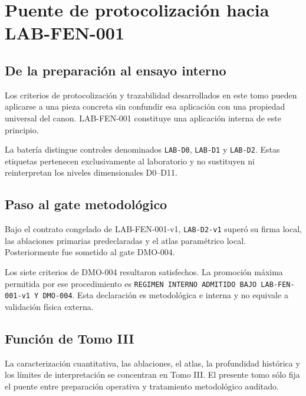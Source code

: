 \chapter*{Puente de protocolización hacia LAB-FEN-001}

\section*{De la preparación al ensayo interno}

\begin{observation}
Los criterios de protocolización y trazabilidad desarrollados en este tomo pueden aplicarse a una pieza concreta sin confundir esa aplicación con una propiedad universal del canon. LAB-FEN-001 constituye una aplicación interna de este principio.
\end{observation}

\begin{observation}
La batería distingue controles denominados \texttt{LAB-D0}, \texttt{LAB-D1} y \texttt{LAB-D2}. Estas etiquetas pertenecen exclusivamente al laboratorio y no sustituyen ni reinterpretan los niveles dimensionales D0--D11.
\end{observation}

\section*{Paso al gate metodológico}

\begin{observation}
Bajo el contrato congelado de LAB-FEN-001-v1, \texttt{LAB-D2-v1} superó su firma local, las ablaciones primarias predeclaradas y el atlas paramétrico local. Posteriormente fue sometido al gate DMO-004.
\end{observation}

\begin{observation}
Los siete criterios de DMO-004 resultaron satisfechos. La promoción máxima permitida por ese procedimiento es \texttt{REGIMEN INTERNO ADMITIDO BAJO LAB-FEN-001-v1 Y DMO-004}. Esta declaración es metodológica e interna y no equivale a validación física externa.
\end{observation}

\section*{Función de Tomo III}

\begin{observation}
La caracterización cuantitativa, las ablaciones, el atlas, la profundidad histórica y los límites de interpretación se concentran en Tomo III. El presente tomo sólo fija el puente entre preparación operativa y tratamiento metodológico auditado.
\end{observation}
